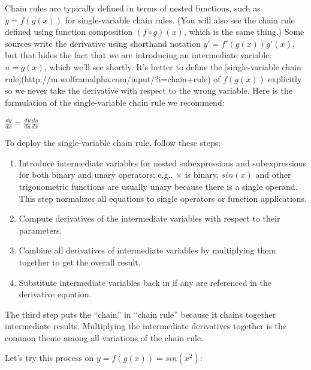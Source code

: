 \documentclass[11pt]{article}
\begin{document}
Chain rules are typically defined in terms of nested functions, such as $y = f(g(x))$ for single-variable chain rules. (You will also see the chain rule defined using function composition $(f \circ g)(x)$, which is the same thing.)  Some sources write the derivative using shorthand notation $y' = f'(g(x))g'(x)$, but that hides the fact that we are introducing an intermediate variable: $u = g(x)$, which we'll see shortly. It's better to define the [single-variable chain rule](http://m.wolframalpha.com/input/?i=chain+rule) of $f(g(x))$ explicitly so we never take the derivative with respect to the wrong variable. Here is the formulation of the single-variable chain rule we recommend:

$\frac{dy}{dx} = \frac{dy}{du}\frac{du}{dx}$

To deploy the single-variable chain rule, follow these steps:

\begin{enumerate}
	\item  Introduce intermediate variables for nested subexpressions and subexpressions for both binary and unary operators; e.g., $\times$ is binary, $sin(x)$ and other trigonometric functions are usually unary because there is a single operand. This step normalizes all equations to single operators or function applications.
	\item Compute derivatives of the intermediate variables with respect to their parameters.
	\item Combine all derivatives of intermediate variables by multiplying them together to get the overall result.
	\item Substitute intermediate variables back in if any are referenced in the derivative equation.
\end{enumerate}

The third step puts the ``chain'' in ``chain rule'' because it chains together intermediate results. Multiplying the intermediate derivatives together is the common theme among all variations of the chain rule.

Let's try  this process on $y = f(g(x)) = sin(x^2)$:
\end{document}
